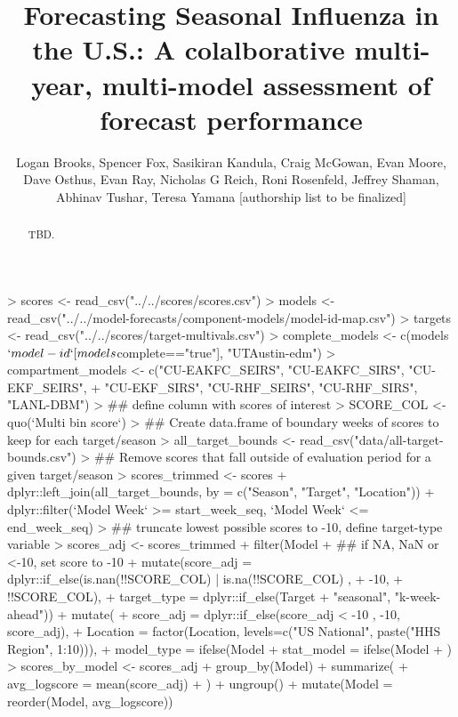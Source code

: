 \documentclass{article}
\title{Forecasting Seasonal Influenza in the U.S.: A colalborative multi-year, multi-model assessment of forecast performance}
\author{Logan Brooks, Spencer Fox, Sasikiran Kandula, Craig McGowan, Evan Moore, \\Dave Osthus, Evan Ray, Nicholas G Reich, Roni Rosenfeld, Jeffrey Shaman, \\Abhinav Tushar, Teresa Yamana [authorship list to be finalized]}
\begin{document}


\maketitle

\begin{abstract}

TBD.

\end{abstract}


\begin{Schunk}
\begin{Sinput}
> scores <- read_csv("../../scores/scores.csv")
> models <- read_csv("../../model-forecasts/component-models/model-id-map.csv")
> targets <- read_csv("../../scores/target-multivals.csv")
> complete_models <- c(models$`model-id`[models$complete=="true"], "UTAustin-edm")
> compartment_models <- c("CU-EAKFC_SEIRS", "CU-EAKFC_SIRS", "CU-EKF_SEIRS", 
+     "CU-EKF_SIRS", "CU-RHF_SEIRS", "CU-RHF_SIRS", "LANL-DBM")
> ## define column with scores of interest
> SCORE_COL <- quo(`Multi bin score`)
> ## Create data.frame of boundary weeks of scores to keep for each target/season
> all_target_bounds <- read_csv("data/all-target-bounds.csv")
> ## Remove scores that fall outside of evaluation period for a given target/season
> scores_trimmed <- scores %
+     dplyr::left_join(all_target_bounds, by = c("Season", "Target", "Location")) %
+     dplyr::filter(`Model Week` >= start_week_seq, `Model Week` <= end_week_seq)
> ## truncate lowest possible scores to -10, define target-type variable
> scores_adj <- scores_trimmed %
+     filter(Model %
+     ## if NA, NaN or <-10, set score to -10
+     mutate(score_adj = dplyr::if_else(is.nan(!!SCORE_COL) | is.na(!!SCORE_COL) , 
+         -10, 
+         !!SCORE_COL),
+         target_type = dplyr::if_else(Target %
+             "seasonal", "k-week-ahead")) %
+     mutate(
+         score_adj = dplyr::if_else(score_adj < -10 , -10, score_adj),
+         Location = factor(Location, levels=c("US National", paste("HHS Region", 1:10))),
+         model_type = ifelse(Model %
+         stat_model = ifelse(Model %
+         ) 
> scores_by_model <- scores_adj %
+     group_by(Model) %
+     summarize(
+         avg_logscore = mean(score_adj)
+     ) %
+     ungroup() %
+     mutate(Model = reorder(Model, avg_logscore))

\end{Sinput}
\end{Schunk}
\end{document}
